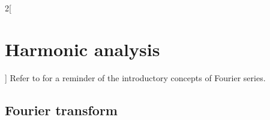 \documentclass[../../../main_math.tex]{subfiles}
\begin{document}
\begin{multicols}{2}[\section{Harmonic analysis}]
  Refer to  for a reminder of the introductory concepts of Fourier series.

  \subsection{Fourier transform}
\end{multicols}
\end{document}
